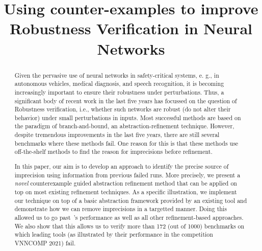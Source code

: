 \documentclass{llncs}
\title{Using counter-examples to improve Robustness Verification in Neural Networks}
\author{}
\institute{}
\begin{document}
\maketitle

\begin{abstract}
  Given the pervasive use of neural networks in safety-critical systems, e. g., in autonomous vehicles, medical diagnosis, and speech recognition, it is becoming increasingly important to ensure their robustness under perturbations. Thus, a significant body of recent work in the last five years has focussed on the question of Robustness verification, i.e., whether such networks are robust (do not alter their behavior) under small perturbations in inputs. Most successful methods are based on the paradigm of branch-and-bound, an abstraction-refinement technique. However, despite tremendous improvements in the last five years, there are still several benchmarks where these methods fail. One reason for this is that these methods use off-the-shelf methods to find the reason for imprecisions before refinement.  %

In this paper, our aim is to develop an approach to identify the precise source of imprecision using information from previous failed runs. More precisely, we present a {\em novel} counterexample guided abstraction refinement method that can be applied on top on most existing refinement techniques. As a specific illustration, we implement our technique  on top of a basic abstraction framework provided by an existing tool\deeppoly{} and demonstrate how we can remove imprecisions in a targetted manner. Doing this allowed us to go past~\deeppoly{}'s performance as well as all other refinement-based approaches. We also show that this allows us to verify more than 172 (out of 1000) benchmarks on which leading tools (as illustrated by their performance in the competition VNNCOMP 2021) fail. 

\end{abstract}
\end{document}
